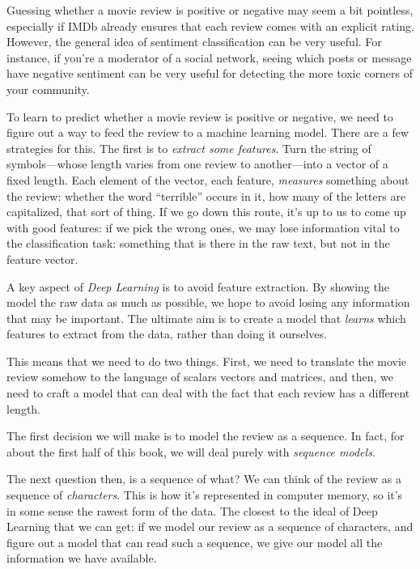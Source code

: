 \documentclass{pca}
\newenvironment{aside}{
	\setlength{\leftskip}{1em}\par\itshape
}{
	
	\setlength{\leftskip}{0em}\par
}
\theoremstyle{theorem}
\theoremstyle{definition}
\theoremstyle{proof}
\begin{document}
\begin{aside}
Guessing whether a movie review is positive or negative may seem a bit pointless, especially if IMDb already ensures that each review comes with an explicit rating. However, the general idea of sentiment classification can be very useful. For instance, if you're a moderator of a social network, seeing which posts or message have negative sentiment can be very useful for detecting the more toxic corners of your community.
\end{aside}

To learn to predict whether a movie review is positive or negative, we need to figure out a way to feed the review to a machine learning model. There are a few strategies for this. The first is to \emph{extract some features}. Turn the string of symbols---whose length varies from one review to another---into a vector of a fixed length. Each element of the vector, each feature, \emph{measures} something about the review: whether the word ``terrible'' occurs in it, how many of the letters are capitalized, that sort of thing. If we go down this route, it's up to us to come up with good features: if we pick the wrong ones, we may lose information vital to the classification task: something that is there in the raw text, but not in the feature vector. 

A key aspect of \emph{Deep Learning} is to avoid feature extraction. By showing the model the raw data as much as possible, we hope to avoid losing any information that may be important. The ultimate aim is to create a model that \emph{learns} which features to extract from the data, rather than doing it ourselves.

This means that we need to do two things. First, we need to translate the movie review somehow to the language of scalars vectors and matrices, and then, we need to craft a model that can deal with the fact that each review has a different length.

The first decision we will make is to model the review as a sequence. In fact, for about the first half of this book, we will deal purely with \emph{sequence models}.

The next question then, is a sequence of what? We can think of the review as a sequence of \emph{characters}. This is how it's represented in computer memory, so it's in some sense the rawest form of the data. The closest to the ideal of Deep Learning that we can get: if we model our review as a sequence of characters, and figure out a model that can read such a sequence, we give our model all the information we have available.
\end{document}
